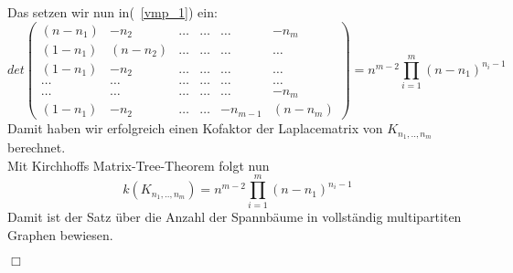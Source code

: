 Das setzen wir nun in(~\ref{vmp_1}) ein:
\begin{equation}
 det
\begin{pmatrix}
 (n-n_1)&-n_2&\ldots&\ldots&\ldots&-n_m\\
 (1-n_1)&(n-n_2)&\ldots&\ldots&\ldots&\ldots\\
 (1-n_1)&-n_2&\ldots&\ldots&\ldots&\ldots\\
 \ldots&\ldots&\ldots&\ldots&\ldots&\ldots\\
 \ldots&\ldots&\ldots&\ldots&\ldots&-n_m\\
 (1-n_1)&-n_2&\ldots&\ldots&-n_{m-1}&(n-n_m)
\end{pmatrix}
= n^{m-2}\prod_{i=1}^{m}(n-n_1)^{n_i-1}
\end{equation}
Damit haben wir erfolgreich einen Kofaktor der Laplacematrix von $K_{n_1,..,n_m}$ berechnet.\\
Mit Kirchhoffs Matrix-Tree-Theorem folgt nun
\begin{equation}
 \mathit{k}(K_{n_1,..,n_m})=n^{m-2}\prod_{i=1}^{m}(n-n_1)^{n_i-1}
\end{equation}
Damit ist der Satz über die Anzahl der Spannbäume in vollständig multipartiten Graphen bewiesen.
\begin{flushright} $\Box$ \end{flushright}
